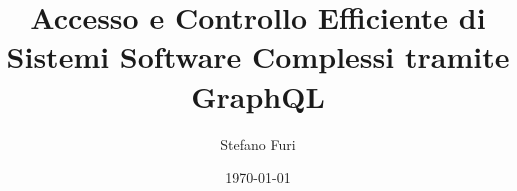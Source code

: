 \documentclass[12pt,a4paper,openright,twoside]{book}
\title{Accesso e Controllo Efficiente di Sistemi Software Complessi tramite GraphQL}
\author{Stefano Furi}
\date{\today}
\begin{document}
\frontmatter\frontispiece




\tableofcontents   
\listoffigures     %
\lstlistoflistings %

\mainmatter








\backmatter




\end{document}
